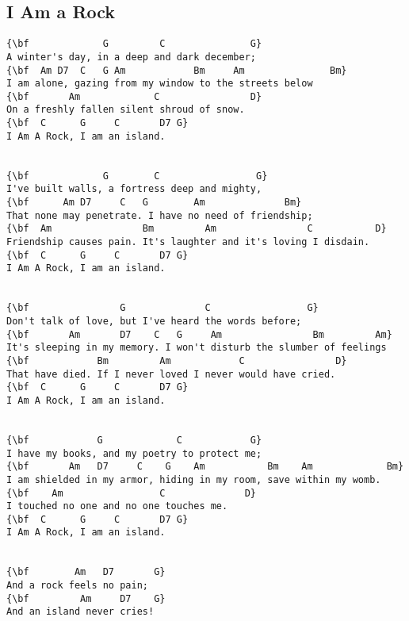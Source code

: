 \documentclass[a4paper]{article}
\begin{document}
\subsection{I Am a Rock}
\begin{Verbatim}[commandchars=\\\{\}]
{\bf             G         C               G}
A winter's day, in a deep and dark december;
{\bf  Am D7  C   G Am            Bm     Am               Bm}
I am alone, gazing from my window to the streets below
{\bf       Am             C                D}
On a freshly fallen silent shroud of snow.
{\bf  C      G     C       D7 G}
I Am A Rock, I am an island.


{\bf             G        C                 G}
I've built walls, a fortress deep and mighty,
{\bf      Am D7     C   G        Am              Bm}
That none may penetrate. I have no need of friendship;
{\bf  Am                Bm         Am                C           D}
Friendship causes pain. It's laughter and it's loving I disdain.
{\bf  C      G     C       D7 G}
I Am A Rock, I am an island.


{\bf                G              C                 G}
Don't talk of love, but I've heard the words before;
{\bf       Am       D7    C   G     Am                Bm         Am}
It's sleeping in my memory. I won't disturb the slumber of feelings
{\bf            Bm         Am            C                D}
That have died. If I never loved I never would have cried.
{\bf  C      G     C       D7 G}
I Am A Rock, I am an island.


{\bf            G             C            G}
I have my books, and my poetry to protect me;
{\bf       Am   D7     C    G    Am           Bm    Am             Bm}
I am shielded in my armor, hiding in my room, save within my womb.
{\bf    Am                 C              D}
I touched no one and no one touches me.
{\bf  C      G     C       D7 G}
I Am A Rock, I am an island.


{\bf        Am   D7       G}
And a rock feels no pain;
{\bf         Am     D7    G}
And an island never cries!

\end{Verbatim}
\newpage
\end{document}
